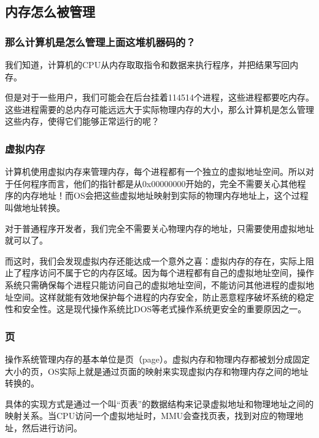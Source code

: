 \documentclass[fontset=none,aspectratio=1610]{ctexbeamer}
\begin{document}
\subsection{内存怎么被管理}

\begin{frame}
    \frametitle{那么计算机是怎么管理上面这堆机器码的？}

    我们知道，计算机的CPU从内存取取指令和数据来执行程序，并把结果写回内存。

    但是对于一些用户，我们可能会在后台挂着114514个进程，这些进程都要吃内存。这些进程需要的总内存可能远远大于实际物理内存的大小，那么计算机是怎么管理这些内存，使得它们能够正常运行的呢？

\end{frame}

\begin{frame}
    \frametitle{虚拟内存}

    计算机使用虚拟内存来管理内存，每个进程都有一个独立的虚拟地址空间。所以对于任何程序而言，他们的指针都是从0x00000000开始的，完全不需要关心其他程序的内存地址！而OS会把这些虚拟地址映射到实际的物理内存地址上，这个过程叫做地址转换。

    对于普通程序开发者，我们完全不需要关心物理内存的地址，只需要使用虚拟地址就可以了。

    而这时，我们会发现虚拟内存还能达成一个意外之喜：虚拟内存的存在，实际上阻止了程序访问不属于它的内存区域。因为每个进程都有自己的虚拟地址空间，操作系统只需确保每个进程只能访问自己的虚拟地址空间，不能访问其他进程的虚拟地址空间。这样就能有效地保护每个进程的内存安全，防止恶意程序破坏系统的稳定性和安全性。这是现代操作系统比DOS等老式操作系统更安全的重要原因之一。

\end{frame}

\begin{frame}
    \frametitle{页}

    操作系统管理内存的基本单位是页（page）。虚拟内存和物理内存都被划分成固定大小的页，OS实际上就是通过页面的映射来实现虚拟内存和物理内存之间的地址转换的。

    具体的实现方式是通过一个叫“页表”的数据结构来记录虚拟地址和物理地址之间的映射关系。当CPU访问一个虚拟地址时，MMU会查找页表，找到对应的物理地址，然后进行访问。

\end{frame}
\end{document}
